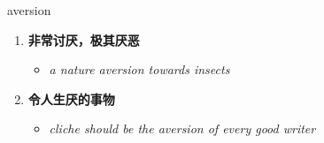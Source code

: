 
\begin{frame}
{\huge aversion}
\begin{center}
\begin{enumerate}\Large
  \item \textbf{非常讨厌，极其厌恶}
  \begin{itemize}
    \item \em{\Large{a nature aversion towards insects}}
  \end{itemize}
  \item \textbf{令人生厌的事物}
  \begin{itemize}
    \item \em{\Large{cliche should be the aversion of every good writer}}
  \end{itemize}
\end{enumerate}
\end{center}
\end{frame}
